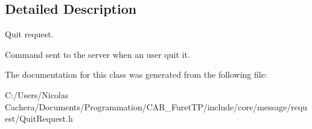 \subsection{Detailed Description}
Quit request. 

Command sent to the server when an user quit it. 

The documentation for this class was generated from the following file\+:\begin{DoxyCompactItemize}
\item 
C\+:/\+Users/\+Nicolas Cachera/\+Documents/\+Programmation/\+C\+A\+R\+\_\+\+Furet\+T\+P/include/core/message/request/Quit\+Request.\+h\end{DoxyCompactItemize}
